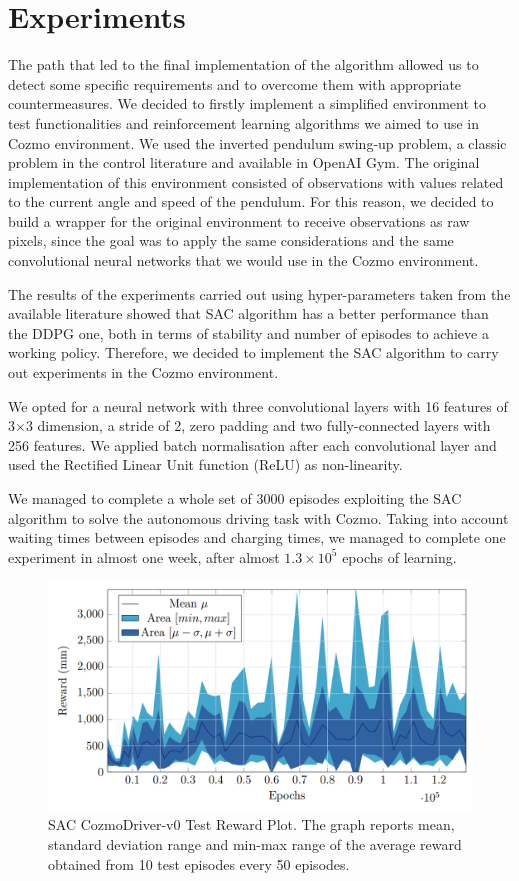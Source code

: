 \documentclass[10pt,twocolumn,letterpaper]{article}
\begin{document}
\section{Experiments}

The path that led to the final implementation of the algorithm allowed us to detect some specific requirements and to overcome them with appropriate countermeasures.
We decided to firstly implement a simplified environment to test functionalities and reinforcement learning algorithms we aimed to use in Cozmo environment.
We used the inverted pendulum swing-up problem, a classic problem in the control literature and available in OpenAI Gym.
The original implementation of this environment consisted of observations with values related to the current angle and speed of the pendulum.
For this reason, we decided to build a wrapper for the original environment to receive observations as raw pixels, since the goal was to apply the same considerations and the same convolutional neural networks that we would use in the Cozmo environment.

The results of the experiments carried out using hyper-parameters taken from the available literature showed that SAC algorithm has a better performance than the DDPG one, both in terms of stability and number of episodes to achieve a working policy.
Therefore, we decided to implement the SAC algorithm to carry out experiments in the Cozmo environment.

We opted for a neural network with three convolutional layers with 16 features of 3$\times$3 dimension, a stride of 2, zero padding and two fully-connected layers with 256 features.
We applied batch normalisation after each convolutional layer and used the Rectified Linear Unit function (ReLU) as non-linearity.

We managed to complete a whole set of 3000 episodes exploiting the SAC algorithm to solve the autonomous driving task with Cozmo.
Taking into account waiting times between episodes and charging times, we managed to complete one experiment in almost one week, after almost $1.3\times 10^5$ epochs of learning.

\begin{figure}[tbp]
    \centering
    \includegraphics[width=0.97\columnwidth]{test_confidence.png}
    \caption[SAC CozmoDriver-v0 Test Reward Plot]{SAC CozmoDriver-v0 Test Reward Plot.
        The graph reports mean, standard deviation range and min-max range of the average reward obtained from 10 test episodes every 50 episodes.}
    \label{confidence}
\end{figure}
\end{document}
